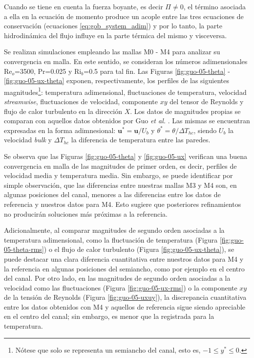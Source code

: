 Cuando se tiene en cuenta la fuerza boyante, es decir $\Pi \neq 0$, el término asociada a ella en la ecuación de momento produce un acople entre las tres ecuaciones de conservación (ecuaciones \ref{eq:gob_system_adim}) y por lo tanto, la parte hidrodinámica del flujo influye en la parte térmica del mismo y visceversa. 

Se realizan simulaciones empleando las mallas M0 - M4 para analizar su convergencia en malla. En este sentido, se consideran los números adimensionales Re$_o$=3500, Pr=0.025 y Ri$_b$=0.5 para tal fin. Las Figuras \ref{fig:guo-05-theta} - \ref{fig:guo-05-ux-theta} exponen, respectivamente, los perfiles de las siguientes magnitudes\footnote{Nótese que solo se representa un semiancho del canal, esto es, $-1 \leqslant y^* \leqslant 0$.}: temperatura adimensional, fluctuaciones de temperatura, velocidad \textit{streamwise}, fluctuaciones de velocidad, componente $xy$ del tensor de Reynolds y flujo de calor turbulento en la dirección $X$. Los datos de magnitudes propias se comparan con aquellos datos obtenidos por Guo \textit{et al.} \cite{guo2022direct}. Las mismas se encuentran expresadas en la forma adimnesional: $\mathbf{u^*} = \mathbf{u} / U_b$ y $\theta^* = \theta / \Delta T_{hc}$, siendo $U_b$ la velocidad \textit{bulk} y $\Delta T_{hc}$ la diferencia de temperatura entre las paredes.

Se observa que las Figuras \ref{fig:guo-05-theta} y \ref{fig:guo-05-ux} verifican una buena convergencia en malla de las  magnitudes de primer orden, es decir, perfiles de velocidad media y temperatura media. Sin embargo, se puede identificar por simple observación, que las diferencias entre nuestras mallas M3 y M4 son, en algunas posiciones del canal, menores a las diferencias entre los datos de referencia y nuestros datos para M4. Esto sugiere que posteriores refinamientos no producirán soluciones más próximas a la referencia. 

Adicionalmente, al comparar magnitudes de segundo orden asociadas a la temperatura adimensional, como la fluctuación de temperatura (Figura \ref{fig:guo-05-theta-rms}) o el flujo de calor turbulento (Figura \ref{fig:guo-05-ux-theta}), se puede destacar una clara diferencia cuantitativa entre nuestros datos para M4 y la referencia en algunas posiciones del semiancho, como por ejemplo en el centro del canal. Por otro lado, en las magnitudes de segundo orden asociadas a la velocidad como las fluctuaciones (Figura \ref{fig:guo-05-ux-rms}) o la componente $xy$ de la tensión de Reynolds (Figura \ref{fig:guo-05-uxuy}), la discrepancia cuantitativa entre los datos obtenidos con M4 y aquellos de referencia sigue siendo apreciable en el centro del canal; sin embargo, es menor que la registrada para la temperatura.

